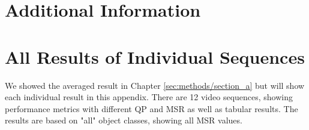 \chapter{Additional Information}


\newpage

\newpage

\newpage

\newpage

\newpage

\chapter{All Results of Individual Sequences}
We showed the averaged result in Chapter \ref{sec:methods/section_a} but will show each individual result in this appendix. There are 12 video sequences, showing performance metrics with different QP and MSR as well as tabular results. The results are based on "all" object classes, showing all MSR values.

\newpage

\newpage

\newpage

\newpage

\newpage

\newpage

\newpage

\newpage

\newpage

\newpage

\newpage

\newpage







